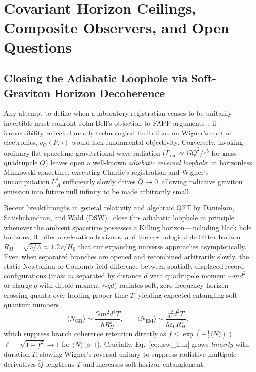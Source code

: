 \section{Covariant Horizon Ceilings, Composite Observers, and Open Questions}
\label{sec:dsw_ceilings}

\subsection{Closing the Adiabatic Loophole via Soft-Graviton Horizon Decoherence}

Any attempt to define when a laboratory registration ceases to be unitarily invertible must confront John Bell's objection to FAPP arguments~\cite{bell1990}: if irreversibility reflected merely technological limitations on Wigner's control electronics, $v_O(P, \tau)$ would lack fundamental objectivity. Conversely, invoking ordinary flat-spacetime gravitational wave radiation ($\Gamma_{\mathrm{rad}} \propto G \dddot{Q}^2 / c^5$ for mass quadrupole $Q$) leaves open a well-known \emph{adiabatic reversal loophole}: in horizonless Minkowski spacetime, executing Charlie's registration and Wigner's uncomputation $U_A^\dagger$ sufficiently slowly drives $\dddot{Q} \to 0$, allowing radiative graviton emission into future null infinity to be made arbitrarily small.

Recent breakthroughs in general relativity and algebraic QFT by Danielson, Satishchandran, and Wald (DSW)~\cite{danielson2023,danielson2025} close this adiabatic loophole in principle whenever the ambient spacetime possesses a Killing horizon---including black hole horizons, Rindler acceleration horizons, and the cosmological de Sitter horizon $R_H = \sqrt{3/\Lambda} \approx 1.2\,c / H_0$ that our expanding universe approaches asymptotically. Even when separated branches are opened and recombined arbitrarily slowly, the static Newtonian or Coulomb field difference between spatially displaced record configurations (mass $m$ separated by distance $d$ with quadrupole moment $\sim m d^2$, or charge $q$ with dipole moment $\sim q d$) radiates soft, zero-frequency horizon-crossing quanta over holding proper time $T$, yielding expected entangling soft-quantum numbers~\cite{danielson2023}
\begin{equation}
    \langle N_{\mathrm{GR}} \rangle \sim \frac{G m^2 d^4 T}{\hbar R_H^5}, \qquad \langle N_{\mathrm{EM}} \rangle \sim \frac{q^2 d^2 T}{\hbar \varepsilon_0 R_H^3},
    \label{eq:dsw_flux}
\end{equation}
which suppress branch coherence retention directly as $f \le \exp(-\frac{1}{2}\langle N \rangle)$ ($\ell = \sqrt{1 - f^2} \to 1$ for $\langle N \rangle \gg 1$). Crucially, Eq.~\eqref{eq:dsw_flux} grows \emph{linearly} with duration $T$: slowing Wigner's reversal unitary to suppress radiative multipole derivatives $\dddot{Q}$ lengthens $T$ and increases soft-horizon entanglement.

